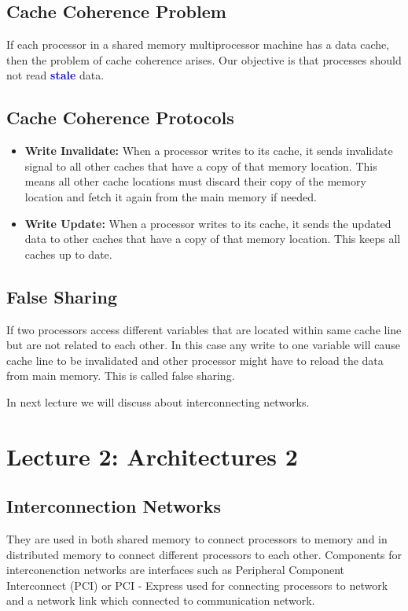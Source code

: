 \documentclass{article}
\begin{document}
\subsection*{Cache Coherence Problem}
If each processor in a shared memory multiprocessor machine has a data cache, then the problem of cache coherence arises. Our objective is that processes should not read \textcolor{blue}{\textbf{stale}} data.

\subsection*{Cache Coherence Protocols}
\begin{itemize}
    \item \textbf{Write Invalidate:} When a processor writes to its cache, it sends invalidate signal to all other caches that have a copy of that memory location. This means all other cache locations must discard their copy of the memory location and fetch it again from the main memory if needed.
    \item \textbf{Write Update:} When a processor writes to its cache, it sends the updated data to other caches that have a copy of that memory location. This keeps all caches up to date.
\end{itemize}

\subsection*{False Sharing}
If two processors access different variables that are located within same cache line but are not related to each other. In this case any write to one variable will cause cache line to be invalidated and other processor might have to reload the data from main memory. This is called false sharing.

In next lecture we will discuss about interconnecting networks.
\newpage

\section*{Lecture 2: Architectures 2}
\subsection*{Interconnection Networks}

They are used in both shared memory to connect processors to memory and in distributed memory to connect different processors to each other. Components for interconenction networks are interfaces such as Peripheral Component Interconnect (PCI) or PCI - Express used for connecting processors to network and a network link which connected to communication network.
\end{document}
